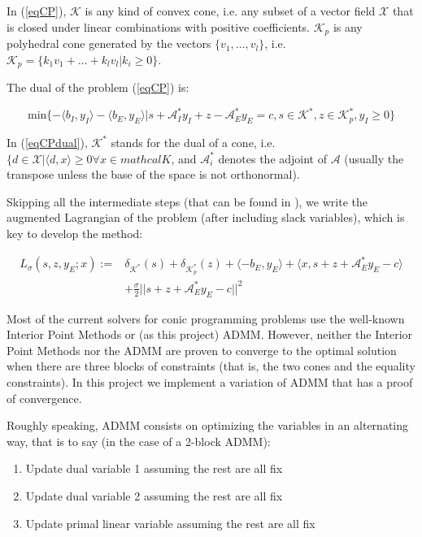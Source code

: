 \documentclass[paper=a4, fontsize=11pt]{scrartcl}
\numberwithin{equation}{section}		%
\numberwithin{figure}{section}			%
\numberwithin{table}{section}				%
\begin{document}
In (\ref{eqCP}), $\mathcal{K}$ is any kind of convex cone, i.e. any subset of a vector field $\mathcal{X}$ that is closed under linear combinations with positive coefficients. $\mathcal{K}_p$ is any polyhedral cone generated by the vectors $\{v_1,\dots,v_l\}$, i.e. $\mathcal{K}_p = \{k_1v_1 + \dots + k_l v_l | k_i \geq 0\}$.

The dual of the problem (\ref{eqCP}) is:

\begin{equation}
\label{eqCPdual}
\text{min}\{-\langle b_I , y_I\rangle -\langle b_E , y_E\rangle | s + \mathcal{A}^{*}_{I} y_I + z - \mathcal{A}^{*}_{E} y_E = c, s\in \mathcal{K}^*, z \in \mathcal{K}_p^*, y_I \geq 0\}
\end{equation}

In (\ref{eqCPdual}), $\mathcal{K}^*$ stands for the dual of a cone, i.e. $\{d \in \mathcal{X} | \langle d,x \rangle \geq 0 \forall x \in mathcal{K}$, and $\mathcal{A}_i^*$ denotes the adjoint of $\mathcal{A}$ (usually the transpose unless the base of the space is not orthonormal). 

Skipping all the intermediate steps (that can be found in \cite{sun2014}), we write the augmented Lagrangian of the problem (after including slack variables), which is key to develop the method:

\begin{align*}
L_{\sigma} (s,z,y_E;x) := & \delta_{\mathcal{K}^*}(s) + \delta_{\mathcal{K}_p^*}(z) + \langle -b_E,y_E \rangle  + \langle x,s+z+\mathcal{A}_E^* y_E - c\rangle \\
& + \frac{\sigma}{2}||s+z+\mathcal{A}_E^* y_E - c||^2 
\end{align*}

Most of the current solvers for conic programming problems use the well-known Interior Point Methods or (as this project) ADMM. However, neither the Interior Point Methods nor the ADMM are proven to converge to the optimal solution when there are three blocks of constraints (that is, the two cones and the equality constraints). In this project we implement a variation of ADMM that has a proof of convergence.

Roughly speaking, ADMM consists on optimizing the variables in an alternating way, that is to say (in the case of a 2-block ADMM):
\begin{enumerate}
\item Update dual variable 1 assuming the rest are all fix
\item Update dual variable 2 assuming the rest are all fix
\item Update primal linear variable assuming the rest are all fix
\end{enumerate}
 
\end{document}
